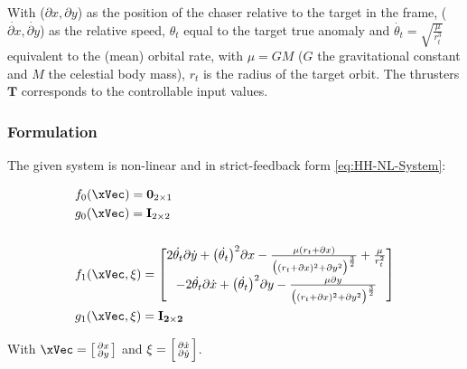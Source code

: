 With (\( \partial x, \partial y\)) as the position of the chaser relative to the target in the  frame, (\(\dot{\partial x}, \dot{\partial y}\)) as the relative speed, \(\theta_t\) equal to the target true anomaly and \(\dot{\theta_t} = \sqrt{\frac{\mu}{r_t^3}}\) equivalent to the (mean) orbital rate, with \(\mu = GM\) (\(G\) the gravitational constant and \(M\) the celestial body mass), \(r_t\) is the radius of the target orbit. The thrusters\(\mathbf{T}\) corresponds to the controllable input values.

\newpage

\subsubsection{ Formulation}
\label{subsubsec:Orbital_CLF-CBF_Experiment_Setup}

The given system is non-linear and in strict-feedback form \ref{eq:HH-NL-System}:

\begin{align}
  & f_0(\xVec) = \mathbf{0}_{2 \times 1}   \notag \\  
  & g_0(\xVec) = \mathbf{I}_{2 \times 2} \label{eq:orbital_0_dyn} \\ \notag \\
  & f_1(\xVec,\xi) = \begin{bmatrix}  2\dot{\theta_t}\partial\dot{y} + \bigl(\dot{\theta_t}\bigr)^2 \partial x - \frac{\mu(r_t + \partial x)}{\bigl((r_t+ \partial x)^2 + \partial y^2\bigr)^{\frac{3}{2}}} + \frac{\mu}{r_t^2}  \\ -2\dot{\theta_t}\partial\dot{x} + \bigl(\dot{\theta_t}\bigr)^2 \partial y - \frac{\mu \partial y}{\bigl((r_t + \partial x)^2 + \partial y^2\bigr)^{\frac{3}{2}}} \end{bmatrix} 
  \notag \\ & g_1(\xVec, \xi) = \mathbf{I_{2 \times 2}}\label{eq:orbital_1_dyn}
\end{align}

With \(\xVec = \bigl[\begin{smallmatrix} \partial x \\ \partial y \end{smallmatrix} \bigr]\) and \(\xi = \Bigl[\begin{smallmatrix} \partial \dot{x} \\ \partial \dot{y} \end{smallmatrix} \Bigr]\). \\

